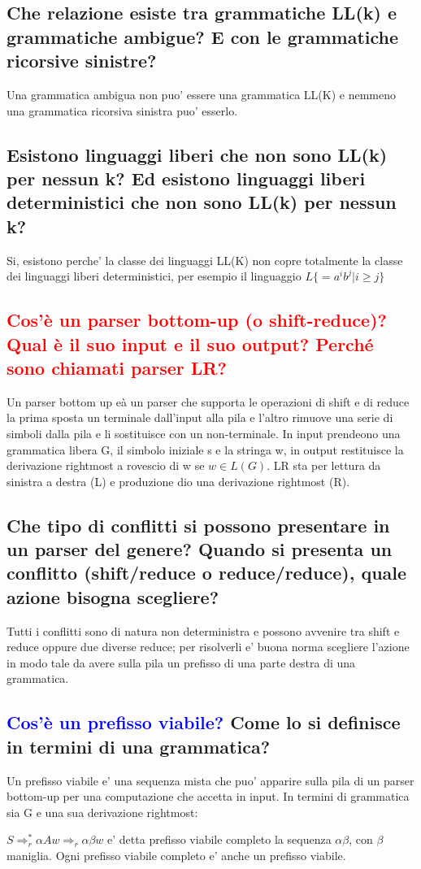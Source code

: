 \documentclass{article}
\begin{document}
\subsection{Che relazione esiste tra grammatiche LL(k) e grammatiche ambigue? E con le grammatiche ricorsive sinistre?}
Una grammatica ambigua non puo' essere una grammatica LL(K) e nemmeno una
grammatica ricorsiva sinistra puo' esserlo.
\subsection{Esistono linguaggi liberi che non sono LL(k) per nessun k? Ed esistono linguaggi liberi deterministici che non sono LL(k) per nessun k?}
Si, esistono perche' la classe dei linguaggi LL(K) non copre totalmente la
classe dei linguaggi liberi deterministici, per esempio il linguaggio
$L\{=a^ib^j|i\geq j\}$

\subsection{\textcolor{red}{Cos'è un parser bottom-up (o shift-reduce)? Qual è il suo input e il suo output? Perché sono chiamati parser LR?}}
Un parser bottom up eà un parser che supporta le operazioni di shift e di reduce la prima sposta un terminale  dall'input alla pila e l'altro rimuove una serie di simboli dalla pila e li sostituisce con un non-terminale.
In input prendeono una grammatica libera G, il simbolo iniziale s e la stringa w, in output restituisce la derivazione rightmost a rovescio di w se $w \in L(G)$.
LR sta per lettura da sinistra a destra (L) e produzione dio una derivazione rightmost (R).
\subsection{Che tipo di conflitti si possono presentare in un parser del genere? Quando si presenta un conflitto (shift/reduce o reduce/reduce), quale azione bisogna scegliere?}
Tutti i conflitti sono di natura non deterministra e possono avvenire tra shift
e reduce oppure due diverse reduce; per risolverli e' buona norma scegliere
l'azione in modo tale da avere sulla pila un prefisso di una parte destra di
una grammatica.
\subsection{\textcolor{blue}{Cos'è un prefisso viabile?} Come lo si definisce in termini di una grammatica?}
Un prefisso viabile e' una sequenza mista che puo' apparire sulla pila di un parser bottom-up per una computazione che accetta in input. In termini di grammatica sia G e una sua derivazione rightmost:
\begin{center}
    $S \Rightarrow^*_r \alpha Aw \Rightarrow_r \alpha\beta w$
    e' detta prefisso viabile completo la sequenza $\alpha\beta$, con $\beta$ maniglia. Ogni prefisso viabile completo e' anche un prefisso viabile.
\end{center}
\end{document}
